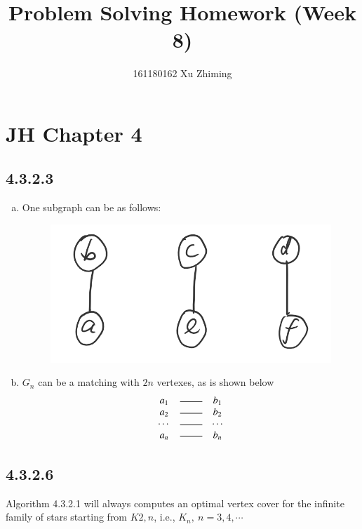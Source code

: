 \documentclass[twocolumn, 10.5pt]{article}
\begin{document}
	\title{Problem Solving Homework (Week 8)}\author{161180162 Xu Zhiming}\maketitle
	\section*{JH Chapter 4}
	\subsection*{4.3.2.3}
	\begin{enumerate}[(a)]
		\item One subgraph can be as follows:
		\begin{figure}[H]
			\centering
			\includegraphics[width=0.7\linewidth]{ex8-1}
		\end{figure}
		\item $G_n$ can be a matching with $2n$ vertexes, as is shown below
		\[
		\begin{matrix}
		a_1&\rule[.5mm]{8mm}{.2mm}&b_1\\
		a_2&\rule[.5mm]{8mm}{.2mm}&b_2\\
		\cdots&\rule[.5mm]{8mm}{.2mm}&\cdots\\
		a_n&\rule[.5mm]{8mm}{.2mm}&b_n\\
		\end{matrix}
		\]
	\end{enumerate}
	\subsection*{4.3.2.6}
	Algorithm 4.3.2.1 will always computes an optimal vertex cover for the infinite family of stars starting from $K{2,n}$, i.e., $K_n,\ n=3,4,\cdots$
\end{document}
